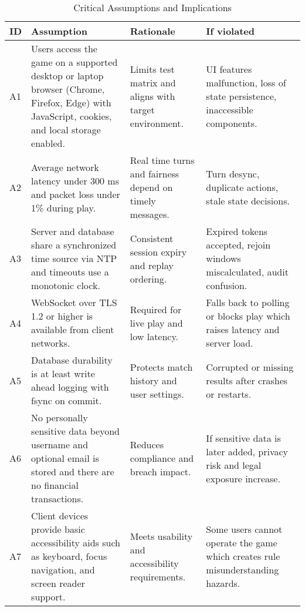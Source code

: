 \documentclass{article}
\begin{document}
\begin{table}[H]
\caption{Critical Assumptions and Implications}\label{tab:assumptions}
\begin{tabularx}{\textwidth}{lX X X}
\toprule
\textbf{ID} & \textbf{Assumption} & \textbf{Rationale} & \textbf{If violated} \\
\midrule
A1 & Users access the game on a supported desktop or laptop browser (Chrome, Firefox, Edge) with JavaScript, cookies, and local storage enabled. & Limits test matrix and aligns with target environment. & UI features malfunction, loss of state persistence, inaccessible components. \\
A2 & Average network latency under 300 ms and packet loss under 1\% during play. & Real time turns and fairness depend on timely messages. & Turn desync, duplicate actions, stale state decisions. \\
A3 & Server and database share a synchronized time source via NTP and timeouts use a monotonic clock. & Consistent session expiry and replay ordering. & Expired tokens accepted, rejoin windows miscalculated, audit confusion. \\
A4 & WebSocket over TLS 1.2 or higher is available from client networks. & Required for live play and low latency. & Falls back to polling or blocks play which raises latency and server load. \\
A5 & Database durability is at least write ahead logging with fsync on commit. & Protects match history and user settings. & Corrupted or missing results after crashes or restarts. \\
A6 & No personally sensitive data beyond username and optional email is stored and there are no financial transactions. & Reduces compliance and breach impact. & If sensitive data is later added, privacy risk and legal exposure increase. \\
A7 & Client devices provide basic accessibility aids such as keyboard, focus navigation, and screen reader support. & Meets usability and accessibility requirements. & Some users cannot operate the game which creates rule misunderstanding hazards. \\
\bottomrule
\end{tabularx}
\end{table}
\end{document}
